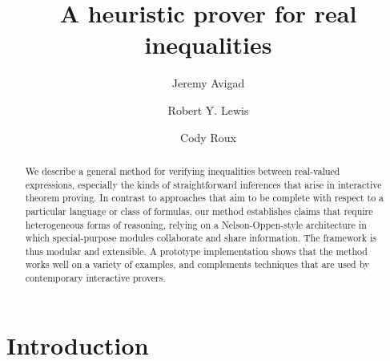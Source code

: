 \documentclass[runningheds]{llncs}
\begin{document}
\title{A heuristic prover for real inequalities}



\author{Jeremy Avigad \and Robert Y. Lewis \and Cody Roux}




\maketitle


\begin{abstract}
We describe a general method for verifying inequalities between real-valued expressions, especially the kinds of straightforward inferences that arise in interactive theorem proving. In contrast to approaches that aim to be complete with respect to a particular language or class of formulas, our method establishes claims that require heterogeneous forms of reasoning, relying on a Nelson-Oppen-style architecture in which special-purpose modules collaborate and share information. The framework is thus modular and extensible. A prototype implementation shows that the method works well on a variety of examples, and complements techniques that are used by contemporary interactive provers.
\end{abstract}


\section{Introduction}
\label{section:introduction}
\end{document}
